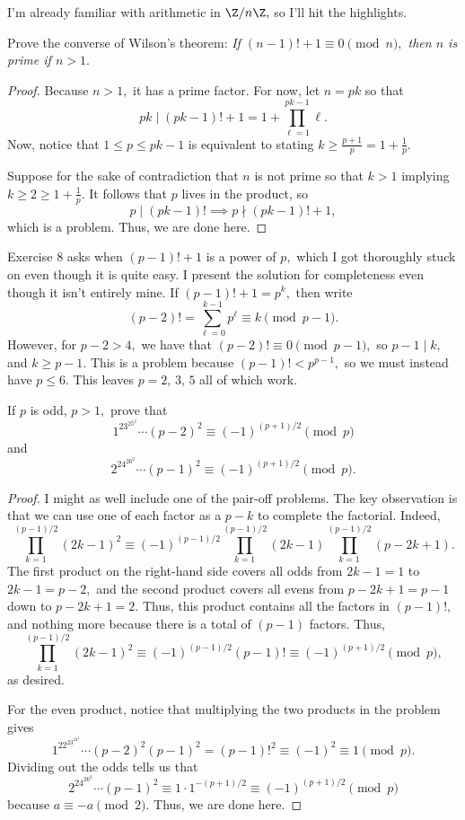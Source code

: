 I'm already familiar with arithmetic in $\Z/n\Z,$ so I'll hit the highlights.

\begin{exercise}[7]
Prove the converse of Wilson's theorem: \textit{If $(n-1)!+1\equiv0\pmod n,$ then $n$ is prime if $n>1.$}
\end{exercise}

\begin{proof}
Because $n>1,$ it has a prime factor. For now, let $n=pk$ so that
\[pk\mid(pk-1)!+1=1+\prod_{\ell=1}^{pk-1}\ell.\]
Now, notice that $1\le p\le pk-1$ is equivalent to stating $k\ge\frac{p+1}p=1+\frac1p.$

Suppose for the sake of contradiction that $n$ is not prime so that $k>1$ implying $k\ge2\ge1+\frac1p.$ It follows that $p$ lives in the product, so
\[p\mid(pk-1)!\implies p\nmid(pk-1)!+1,\]
which is a problem. Thus, we are done here.
\end{proof}

Exercise 8 asks when $(p-1)!+1$ is a power of $p,$ which I got thoroughly stuck on even though it is quite easy. I present the solution for completeness even though it isn't entirely mine. If $(p-1)!+1=p^k,$ then write
\[(p-2)!=\sum_{\ell=0}^{k-1}p^\ell\equiv k\pmod{p-1}.\]
However, for $p-2>4,$ we have that $(p-2)!\equiv0\pmod{p-1},$ so $p-1\mid k,$ and $k\ge p-1.$ This is a problem because $(p-1)!<p^{p-1},$ so we must instead have $p\le6.$ This leaves $p=2,\,3,\,5$ all of which work.

\begin{exercise}[10]
If $p$ is odd, $p>1,$ prove that
\[1^23^25^2\cdots(p-2)^2\equiv(-1)^{(p+1)/2}\pmod p\]
and
\[2^24^26^2\cdots(p-1)^2\equiv(-1)^{(p+1)/2}\pmod p.\]
\end{exercise}

\begin{proof}
I might as well include one of the pair-off problems. The key observation is that we can use one of each factor as a $p-k$ to complete the factorial. Indeed,
\[\prod_{k=1}^{(p-1)/2}(2k-1)^2\equiv(-1)^{(p-1)/2}\prod_{k=1}^{(p-1)/2}(2k-1)\prod_{k=1}^{(p-1)/2}(p-2k+1).\]
The first product on the right-hand side covers all odds from $2k-1=1$ to $2k-1=p-2,$ and the second product covers all evens from $p-2k+1=p-1$ down to $p-2k+1=2.$ Thus, this product contains all the factors in $(p-1)!,$ and nothing more because there is a total of $(p-1)$ factors. Thus,
\[\prod_{k=1}^{(p-1)/2}(2k-1)^2\equiv(-1)^{(p-1)/2}(p-1)!\equiv(-1)^{(p+1)/2}\pmod p,\]
as desired.

For the even product, notice that multiplying the two products in the problem gives
\[1^22^23^24^2\cdots(p-2)^2(p-1)^2=(p-1)!^2\equiv(-1)^2\equiv1\pmod p.\]
Dividing out the odds tells us that
\[2^24^26^2\cdots(p-1)^2\equiv1\cdot1^{-(p+1)/2}\equiv(-1)^{(p+1)/2}\pmod p\]
because $a\equiv-a\pmod 2.$ Thus, we are done here.
\end{proof}


